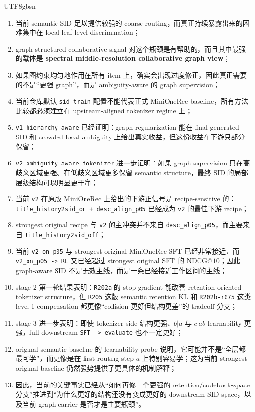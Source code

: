 \documentclass[11pt]{article}
\begin{document}
\begin{CJK*}{UTF8}{gbsn}
\begin{enumerate}
  \item 当前 semantic SID 足以提供较强的 coarse routing，而真正持续暴露出来的困难集中在 local leaf-level discrimination；
  \item graph-structured collaborative signal 对这个瓶颈是有帮助的，而且其中最强的载体是 \textbf{spectral middle-resolution collaborative graph view}；
  \item 如果图约束均匀地作用在所有 item 上，确实会出现过度修正，因此真正需要的不是“更强 graph”，而是 ambiguity-aware 的 graph supervision；
  \item 当前仓库默认 \texttt{sid-train} 配置不能代表正式 MiniOneRec baseline，所有方法比较都必须建立在 upstream-aligned tokenizer regime 上；
  \item \texttt{v1 hierarchy-aware} 已经证明：graph regularization 能在 final generated SID 和 crowded local ambiguity 上给出真实收益，但这份收益在下游只部分保留；
  \item \texttt{v2 ambiguity-aware tokenizer} 进一步证明：如果 graph supervision 只在高歧义区域更强、在低歧义区域更多保留 semantic structure，最终 SID 的局部层级结构可以明显更干净；
  \item 当前 \texttt{v2} 在原版 MiniOneRec 上给出的下游正信号是 recipe-sensitive 的：\texttt{title\_history2sid\_on + desc\_align\_p05} 已经成为 \texttt{v2} 的最佳下游 recipe；
  \item strongest original recipe 与 \texttt{v2} 的主冲突并不来自 \texttt{desc\_align\_p05}，而主要来自 \texttt{title\_history2sid\_off}；
  \item 当前 \texttt{v2\_on\_p05} 与 strongest original MiniOneRec SFT 已经非常接近，而 \texttt{v2\_on\_p05 -> RL} 又已经超过 strongest original SFT 的 \(\mathrm{NDCG}@10\)；因此 graph-aware SID 不是无效主线，而是一条已经接近工作区间的主线；
  \item stage-2 第一轮结果表明：\texttt{R202a} 的 stop-gradient 能改善 retention-oriented tokenizer structure，但 \texttt{R205} 这版 semantic retention KL 和 \texttt{R202b-r075} 这类 level-1 compensation 都更像“collision 更好但结构更差”的 tradeoff 分支；
  \item stage-3 进一步表明：即使 tokenizer-side 结构更强、\(b|a\) 与 \(c|ab\) learnability 更强，full downstream \texttt{SFT -> evaluate} 也不一定更好；
  \item original semantic baseline 的 learnability probe 说明，它可能并不是“全层都最可学”，而更像是在 first routing step \(a\) 上特别容易学；这为当前 strongest original baseline 仍然强势提供了更具体的机制解释；
  \item 因此，当前的关键事实已经从“如何再修一个更强的 retention/codebook-space 分支”推进到“为什么更好的结构还没有变成更好的 downstream SID space，以及当前 graph carrier 是否才是主要瓶颈”。
\end{enumerate}


\end{CJK*}
\end{document}

